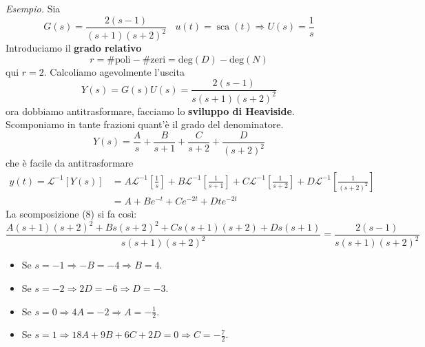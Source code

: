 \documentclass[10pt,a4paper]{book}
\DeclareMathOperator{\sca}{sca}
\begin{document}
\textit{Esempio.} Sia
\begin{equation*}
	G(s) =\frac{2(s-1)}{(s+1)(s+2)^2} \ \ \ \ u(t) =\sca(t) \Rightarrow U(s) =\frac{1}{s}
\end{equation*}
Introduciamo il \textbf{grado relativo}
\begin{equation*}
	\boxed{r=\#\text{poli} -\#\text{zeri} =\mathrm{deg}(D) -\mathrm{deg}(N)}
\end{equation*}
qui $r=2$. Calcoliamo agevolmente l'uscita
\begin{equation*}
	Y(s) =G(s) U(s) =\frac{2(s-1)}{s(s+1)(s+2)^2}
\end{equation*}
ora dobbiamo antitrasformare, facciamo lo \textbf{sviluppo di Heaviside}. Scomponiamo in tante frazioni quant'è il grado del denominatore.
\begin{equation}
	Y(s)=\frac{A}{s} +\frac{B}{s+1} +\frac{C}{s+2} +\frac{D}{(s+2)^2}
\end{equation}
che è facile da antitrasformare
\begin{equation*}
	\begin{aligned}
		y(t) =\mathcal{L}^{-1}[ Y(s)] & =A\mathcal{L}^{-1}\left[\frac{1}{s}\right] +B\mathcal{L}^{-1}\left[\frac{1}{s+1}\right] +C\mathcal{L}^{-1}\left[\frac{1}{s+2}\right] +D\mathcal{L}^{-1}\left[\frac{1}{(s+2)^2}\right] \\
		                              & =A+Be^{-t} +Ce^{-2t} +Dte^{-2t}                                                                                                                                                       
	\end{aligned}
\end{equation*}
La scomposizione (8) si fa così:
\begin{equation*}
	\frac{A(s+1)(s+2)^2 +Bs(s+2)^2 +Cs(s+1)(s+2)+Ds(s+1)}{s(s+1)(s+2)^2} =\frac{2(s-1)}{s(s+1)(s+2)^2}
\end{equation*}
\begin{itemize}
	\item Se $s=-1\Rightarrow -B=-4\Rightarrow B=4$.
	\item Se $s=-2\Rightarrow 2D=-6\Rightarrow D=-3$.
	\item Se $s=0\Rightarrow 4A=-2\Rightarrow A=-\frac{1}{2}$.
	\item Se $s=1\Rightarrow 18A+9B+6C+2D=0\Rightarrow C=-\frac{7}{2}$.
\end{itemize}
\end{document}

